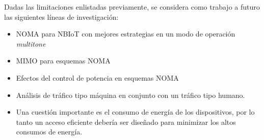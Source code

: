 Dadas las limitaciones enlistadas previamente, se considera como trabajo a futuro las siguientes líneas de investigación:
\begin{itemize}
    \item NOMA para NBIoT con mejores estrategias en un modo de operación \textit{multitone}
    \item MIMO para esquemas NOMA
    \item Efectos del control de potencia en esquemas NOMA
    \item Análisis de tráfico tipo máquina en conjunto con un tráfico tipo humano.
    \item Una cuestión importante es el consumo de energía de los dispositivos, por lo tanto un acceso eficiente debería ser diseñado para minimizar los altos consumos de energía.
\end{itemize}


